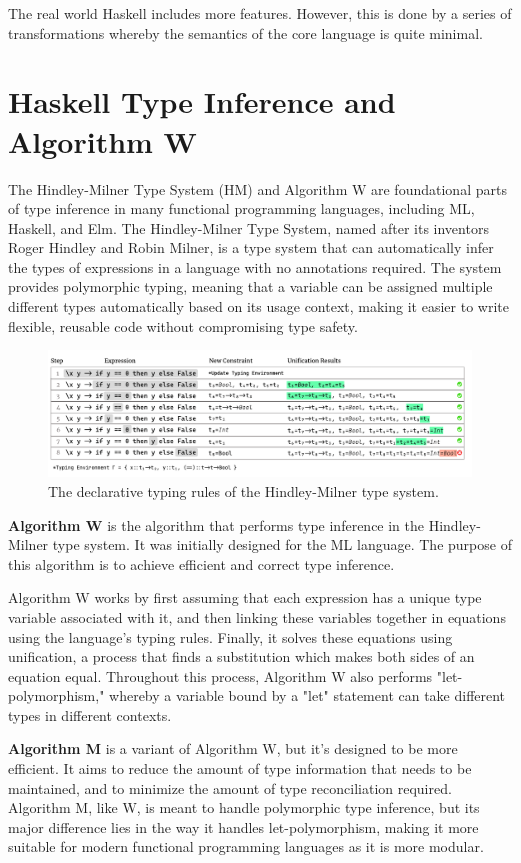 The real world Haskell includes more features. However, this is done by a series of transformations whereby the semantics of the core language is quite minimal.


\section{Haskell Type Inference and Algorithm W}

The Hindley-Milner Type System (HM) and Algorithm W are foundational parts of type inference in many functional programming languages, including ML, Haskell, and Elm. The Hindley-Milner Type System, named after its inventors Roger Hindley and Robin Milner, is a type system that can automatically infer the types of expressions in a language with no annotations required. The system provides polymorphic typing, meaning that a variable can be assigned multiple different types automatically based on its usage context, making it easier to write flexible, reusable code without compromising type safety.

\begin{figure}[hbt]
    \includegraphics[width=0.5\linewidth]{HindleyMilner}
    \caption{
        The declarative typing rules of the Hindley-Milner type system.}
\end{figure}



\textbf{Algorithm W} is the algorithm that performs type inference in the Hindley-Milner type system. It was initially designed for the ML language. The purpose of this algorithm is to achieve efficient and correct type inference.


Algorithm W works by first assuming that each expression has a unique type variable associated with it, and then linking these variables together in equations using the language's typing rules. Finally, it solves these equations using unification, a process that finds a substitution which makes both sides of an equation equal. Throughout this process, Algorithm W also performs "let-polymorphism," whereby a variable bound by a "let" statement can take different types in different contexts.


\textbf{Algorithm M} is a variant of Algorithm W, but it's designed to be more efficient. It aims to reduce the amount of type information that needs to be maintained, and to minimize the amount of type reconciliation required. Algorithm M, like W, is meant to handle polymorphic type inference, but its major difference lies in the way it handles let-polymorphism, making it more suitable for modern functional programming languages as it is more modular.


